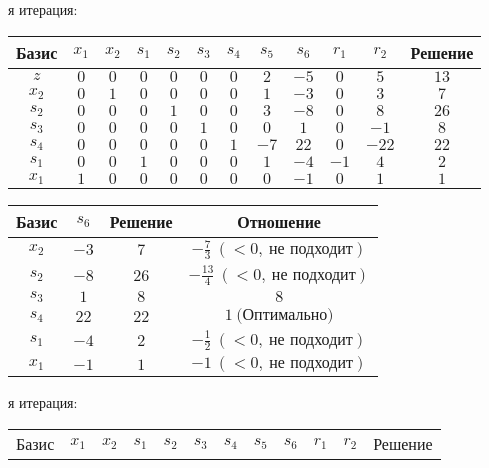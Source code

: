\documentclass{article}%
\begin{document}
\begin{flushleft}
\newline%
\newline%
я итерация: %
\newline%
\newline%
\renewcommand{\arraystretch}{1.3}%
\begin{tabular}{|c|cccccccccc|c|}%
\hline%
Базис&$x_{1}$&$x_{2}$&$s_{1}$&$s_{2}$&$s_{3}$&$s_{4}$&$s_{5}$&$s_{6}$&$r_{1}$&$r_{2}$&Решение\\%
\hline%
$z$&$0$&$0$&$0$&$0$&$0$&$0$&$2$&$-5$&$0$&$5$&$13$\\%
\hline%
$x_{2}$&$0$&$1$&$0$&$0$&$0$&$0$&$1$&$-3$&$0$&$3$&$7$\\%
$s_{2}$&$0$&$0$&$0$&$1$&$0$&$0$&$3$&$-8$&$0$&$8$&$26$\\%
$s_{3}$&$0$&$0$&$0$&$0$&$1$&$0$&$0$&$1$&$0$&$-1$&$8$\\%
$s_{4}$&$0$&$0$&$0$&$0$&$0$&$1$&$-7$&$22$&$0$&$-22$&$22$\\%
$s_{1}$&$0$&$0$&$1$&$0$&$0$&$0$&$1$&$-4$&$-1$&$4$&$2$\\%
$x_{1}$&$1$&$0$&$0$&$0$&$0$&$0$&$0$&$-1$&$0$&$1$&$1$\\%
\hline%
\end{tabular}%
\newline%
\newline%
\newline%
\begin{tabular}{|cccc|}%
\hline%
Базис&$s_{6}$&Решение&Отношение\\%
\hline%
$x_{2}$&$-3$&$7$&$-\frac{7}{3}\: (< 0, \: \text{не подходит})$\\%
$s_{2}$&$-8$&$26$&$-\frac{13}{4}\: (< 0, \: \text{не подходит})$\\%
$s_{3}$&$1$&$8$&$8$\\%
$s_{4}$&$22$&$22$&$1\: \text{(Оптимально)}$\\%
$s_{1}$&$-4$&$2$&$-\frac{1}{2}\: (< 0, \: \text{не подходит})$\\%
$x_{1}$&$-1$&$1$&$-1\: (< 0, \: \text{не подходит})$\\%
\hline%
\end{tabular}%
\newline%
\newline%
я итерация: %
\newline%
\newline%
\renewcommand{\arraystretch}{1.3}%
\begin{tabular}{|c|cccccccccc|c|}%
\hline%
Базис&$x_{1}$&$x_{2}$&$s_{1}$&$s_{2}$&$s_{3}$&$s_{4}$&$s_{5}$&$s_{6}$&$r_{1}$&$r_{2}$&Решение\\%

\end{tabular}
\end{flushleft}
\end{document}
